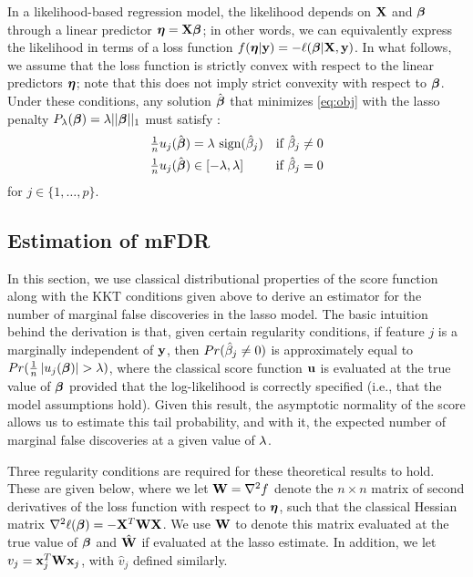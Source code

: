 In a likelihood-based regression model, the likelihood depends on $\mathbf{X}$ and $\boldsymbol{\beta}$ through a linear predictor $\boldsymbol{\eta} = \mathbf{X}\boldsymbol{\beta}$; in other words, we can equivalently express the likelihood in terms of a loss function $f(\boldsymbol{\eta}|\mathbf{y})=-\ell(\boldsymbol{\beta}|\mathbf{X},\mathbf{y})$.
In what follows, we assume that the loss function is strictly convex with respect to the linear predictors $\boldsymbol{\eta}$; note that this does not imply strict convexity with respect to $\boldsymbol{\beta}$.
Under these conditions, any solution $\hat{\boldsymbol{\beta}}$ that minimizes \eqref{eq:obj} with the lasso penalty $P_{\lambda} (\boldsymbol{\beta}) = \lambda||\boldsymbol{\beta}||_1$ must satisfy \citep{lasso_kkt}:
\begin{equation}
  \label{eq:kkt}
  \begin{alignedat}{2}
  \tfrac{1}{n}u_j(\hat{\boldsymbol{\beta}}) &= \lambda \textrm{ sign}(\hat{\beta}_j) &\quad \text{if } \hat{\beta}_j &\neq 0 \\
  \tfrac{1}{n}u_j(\hat{\boldsymbol{\beta}}) &\in [-\lambda,\lambda]  &\quad \text{if }  \hat{\beta}_j &= 0
  \end{alignedat}
\end{equation}
for $j \in \{1, \ldots, p\}$.

\subsection{Estimation of mFDR}

In this section, we use classical distributional properties of the score function along with the KKT conditions given above to derive an estimator for the number of marginal false discoveries in the lasso model.
The basic intuition behind the derivation is that, given certain regularity conditions, if feature $j$ is a marginally independent of $\mathbf{y}$, then $Pr(\hat{\beta}_j \neq 0)$ is approximately equal to $Pr(\tfrac{1}{n}\left\lvert u_j(\boldsymbol{\beta})\right\rvert > \lambda)$, where the classical score function $\mathbf{u}$ is evaluated at the true value of $\boldsymbol{\beta}$ provided that the log-likelihood is correctly specified (i.e., that the model assumptions hold).
Given this result, the asymptotic normality of the score allows us to estimate this tail probability, and with it, the expected number of marginal false discoveries at a given value of $\lambda$.

Three regularity conditions are required for these theoretical results to hold.  These are given below, where we let $\mathbf{W} = \nabla^2f$ denote the $n \times n$ matrix of second derivatives of the loss function with respect to $\boldsymbol{\eta}$, such that the classical Hessian matrix $\nabla^2 \ell (\boldsymbol{\beta}) = -\mathbf{X}^T\mathbf{W}\mathbf{X}$.  We use $\mathbf{W}$ to denote this matrix evaluated at the true value of $\boldsymbol{\beta}$ and $\hat{\mathbf{W}}$ if evaluated at the lasso estimate.  In addition, we let $v_j=\mathbf{x}_j^T\mathbf{W}\mathbf{x}_j$, with $\hat{v}_j$ defined similarly.

